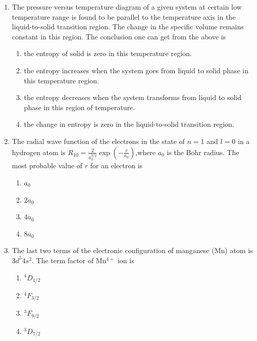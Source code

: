 \documentclass[journal,12pt,onecolumn]{IEEEtran}
\theoremstyle{remark}
\begin{document}
\begin{enumerate}
\item The pressure versus temperature diagram of a given system at certain low temperature range is found to be parallel to the temperature axis in the liquid-to-solid transition region. The change in the specific volume remains constant in this region. The conclusion one can get from the above is

\hfill{}
    \begin{enumerate}
        \item the entropy of solid is zero in this temperature region.
        \item the entropy increases when the system goes from liquid to solid phase in this temperature region.
        \item the entropy decreases when the system transforms from liquid to solid phase in this region of temperature.
        \item the change in entropy is zero in the liquid-to-solid transition region.
    \end{enumerate}


\item The radial wave function of the electrons in the state of $n=1$ and $l=0$ in a hydrogen atom is $ R_{10} = \frac{2}{a_0^{3/2}} \exp( -\frac{r}{a_0} )$,where $a_0$ is the Bohr radius. The most probable value of $r$ for an electron is 

\hfill{}
\begin{multicols}{4}
    \begin{enumerate}
        \item $a_0$
        \item $2a_0$
        \item $4a_0$
        \item $8a_0$
     \end{enumerate}
\end{multicols}
\item The last two terms of the electronic configuration of manganese (Mn) atom is $3d^5 4s^2$. The term factor of Mn$^{4+}$ ion is
\hfill{}
\begin{multicols}{4}
    \begin{enumerate} 
        \item $^4D_{1/2}$
        \item $^4F_{3/2}$
        \item $^3F_{9/2}$
        \item $^3D_{7/2}$
    \end{enumerate}
\end{multicols}


\end{enumerate}
\end{document}
